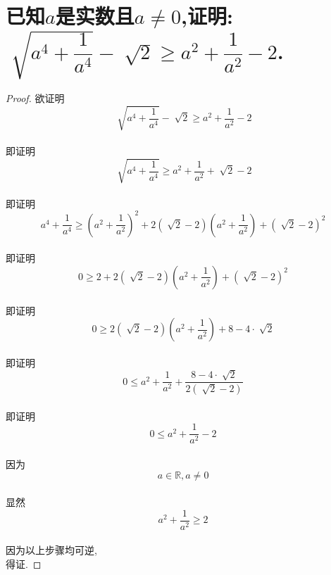 \documentclass[oneside]{book}
\newcommand{\1}{\underline{\makebox[1cm]{}}}
\newcommand{\2}{\underline{\makebox[2cm]{}}}
\newcommand{\3}{\underline{\makebox[3cm]{}}}
\newcommand{\4}{\underline{\makebox[4cm]{}}}
\newlength{\la}
\begin{document}
        \section{已知$a$是实数且$a \neq 0$,证明: $\sqrt[]{a^4+\dfrac{1}{a^4}} - \sqrt[]{2} \geq a^2+\dfrac{1}{a^2}-2$.}
        {\large
            \begin{proof}
            欲证明$$\sqrt[]{a^4+\dfrac{1}{a^4}}-\sqrt[]{2} \geq a^2+\dfrac{1}{a^2}-2$$\\
            即证明$$\sqrt[]{a^4+\dfrac{1}{a^4}} \geq a^2+\dfrac{1}{a^2} + \sqrt[]{2} - 2$$\\
            即证明$$a^4+\dfrac{1}{a^4} \geq {(a^2+\dfrac{1}{a^2})}^2 + 2(\sqrt[]{2} - 2)(a^2+\dfrac{1}{a^2})+{(\sqrt[]{2} - 2)}^2$$\\
            即证明$$0 \geq 2 + 2(\sqrt[]{2} - 2)(a^2+\dfrac{1}{a^2}) + {(\sqrt[]{2} - 2)}^2$$\\
            即证明$$0 \geq 2(\sqrt[]{2} - 2)(a^2+\dfrac{1}{a^2})+8 - 4\cdot \sqrt[]{2}$$\\
            即证明$$0 \leq a^2+\dfrac{1}{a^2} + \dfrac{8 - 4\cdot \sqrt[]{2}}{2(\sqrt[]{2} - 2)}$$\\
            即证明$$0 \leq a^2+\dfrac{1}{a^2} - 2$$\\
            因为$$a \in \mathbb{R}, a \neq 0$$\\
            显然$$a^2+\dfrac{1}{a^2} \geq 2$$\\
            因为以上步骤均可逆,\\
            得证.

            \end{proof}
        }
    
\end{document}
